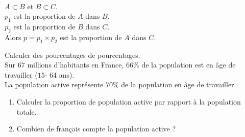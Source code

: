 \begin{Propriété} $ $ \\
\begin{minipage}[c]{0.5\linewidth}
$A\subset B$ et $B \subset C$.\\
$p_1$ est la proportion de $A$ dans $B$.\\
$p_2$ est la proportion de $B$ dans $C$.\\
Alors $p=p_1\times p_2$ est la proportion de $A$ dans $C$.
\end{minipage} \hfill
\begin{minipage}[c]{0.4\linewidth}
\begin{center} 
\end{center}
\end{minipage}
\end{Propriété}

\begin{Méthode}Calculer des pourcentages de pourcentages. \\
Sur $67$ millions d'habitants en France, $66 \%$ de la population est en âge de travailler ($15$- $64$ ans).\\
La population active représente $70 \%$ de la population en âge de travailler.
\begin{enumerate}
\item Calculer la proportion de population active par rapport à la population totale.

\ligne

\ligne

\ligne

\ligne

\ligne

\ligne

\ligne

\ligne

\item Combien de français compte la population active ?

\ligne

\ligne

\end{enumerate}
\end{Méthode}

